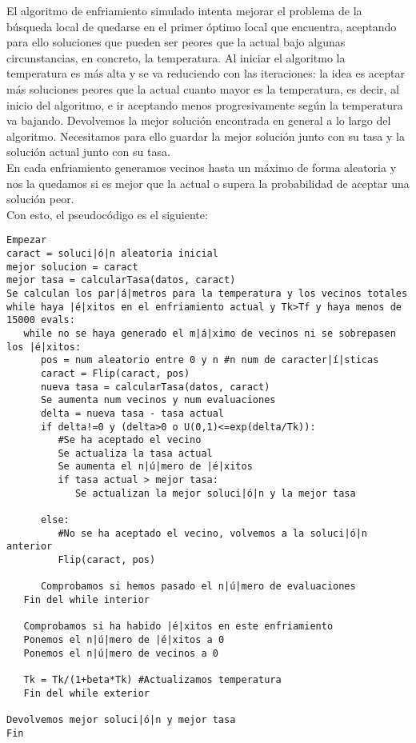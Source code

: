\documentclass[12pt]{article}
\begin{document}
El algoritmo de enfriamiento simulado intenta mejorar el problema de la búsqueda local de quedarse en el primer óptimo local que encuentra, aceptando para ello soluciones que pueden ser peores que la actual bajo algunas circunstancias, en concreto, la temperatura. Al iniciar el algoritmo la temperatura es más alta y se va reduciendo con las iteraciones: la idea es aceptar más soluciones peores que la actual cuanto mayor es la temperatura, es decir, al inicio del algoritmo, e ir aceptando menos progresivamente según la temperatura va bajando. Devolvemos la mejor solución encontrada en general a lo largo del algoritmo. Necesitamos para ello guardar la mejor solución junto con su tasa y la solución actual junto con su tasa.\\
En cada enfriamiento generamos vecinos hasta un máximo de forma aleatoria y nos la quedamos si es mejor que la actual o supera la probabilidad de aceptar una solución peor.\\

Con esto, el pseudocódigo es el siguiente:
\begin{lstlisting}
Empezar
caract = soluci|ó|n aleatoria inicial
mejor solucion = caract
mejor tasa = calcularTasa(datos, caract)
Se calculan los par|á|metros para la temperatura y los vecinos totales
while haya |é|xitos en el enfriamiento actual y Tk>Tf y haya menos de 15000 evals:
   while no se haya generado el m|á|ximo de vecinos ni se sobrepasen los |é|xitos:
      pos = num aleatorio entre 0 y n #n num de caracter|í|sticas
      caract = Flip(caract, pos)
      nueva tasa = calcularTasa(datos, caract)
      Se aumenta num vecinos y num evaluaciones
      delta = nueva tasa - tasa actual
      if delta!=0 y (delta>0 o U(0,1)<=exp(delta/Tk)):
         #Se ha aceptado el vecino
         Se actualiza la tasa actual
         Se aumenta el n|ú|mero de |é|xitos
         if tasa actual > mejor tasa:
            Se actualizan la mejor soluci|ó|n y la mejor tasa
      
      else:
         #No se ha aceptado el vecino, volvemos a la soluci|ó|n anterior
         Flip(caract, pos)
         
      Comprobamos si hemos pasado el n|ú|mero de evaluaciones
   Fin del while interior
   
   Comprobamos si ha habido |é|xitos en este enfriamiento
   Ponemos el n|ú|mero de |é|xitos a 0
   Ponemos el n|ú|mero de vecinos a 0
      
   Tk = Tk/(1+beta*Tk) #Actualizamos temperatura
   Fin del while exterior
      
Devolvemos mejor soluci|ó|n y mejor tasa
Fin
\end{lstlisting}
\end{document}
